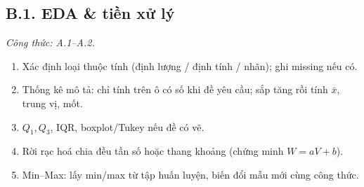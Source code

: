 \subsection*{B.1. EDA \& tiền xử lý}
\textit{Công thức: A.1--A.2.}
\begin{enumerate}
  \item Xác định loại thuộc tính (định lượng / định tính / nhãn); ghi missing nếu có.
  \item Thống kê mô tả: chỉ tính trên ô có số khi đề yêu cầu; sắp tăng rồi tính \(\bar x\), trung vị, mốt.
  \item \(Q_1,Q_3\), IQR, boxplot/Tukey nếu đề có vẽ.
  \item Rời rạc hoá chia đều tần số hoặc thang khoảng (chứng minh \(W=aV+b\)).
  \item Min--Max: lấy min/max từ tập huấn luyện, biến đổi mẫu mới cùng công thức.
\end{enumerate}
